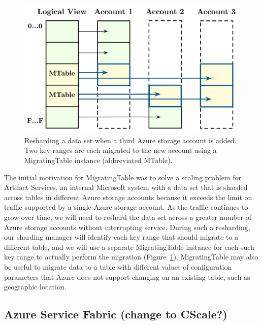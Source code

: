 \begin{figure}[t]
\centering
\includegraphics[width=\linewidth]{img/livemigration}
\caption{Resharding a data set when a third Azure storage account is added. Two key ranges are each migrated to the new account using a MigratingTable instance (abbreviated MTable).}
\label{fig:livemigration}
\end{figure}

The initial motivation for MigratingTable was to solve a scaling problem for Artifact Services, an internal Microsoft system with a data set that is sharded across tables in different Azure storage accounts because it exceeds the limit on traffic supported by a single Azure storage account.  As the traffic continues to grow over time, we will need  to reshard the data set across a greater number of Azure storage accounts without interrupting service.  During such a resharding, our sharding manager will identify each key range that should migrate to a different table, and we will use a separate MigratingTable instance for each such key range to actually perform the migration (Figure~\ref{fig:livemigration}).  MigratingTable may also be useful to migrate data to a table with different values of configuration parameters that Azure does not support changing on an existing table, such as geographic location.

\subsection{Azure Service Fabric (change to CScale?)}
\label{sec:cases:fabric}

